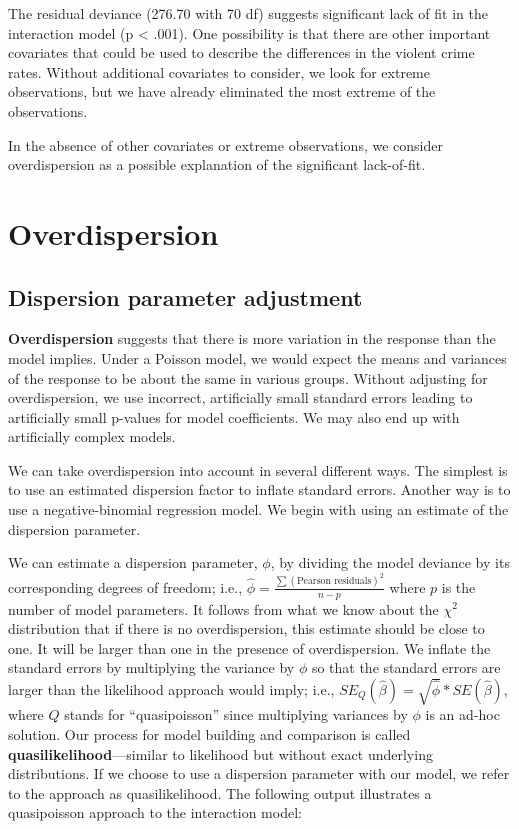\documentclass[
]{krantz}
\begin{document}
The residual deviance (276.70 with 70 df) suggests significant lack of fit in the interaction model (p \textless{} .001). One possibility is that there are other important covariates that could be used to describe the differences in the violent crime rates. Without additional covariates to consider, we look for extreme observations, but we have already eliminated the most extreme of the observations.

In the absence of other covariates or extreme observations, we consider overdispersion as a possible explanation of the significant lack-of-fit.

\hypertarget{sec-overdispPois}{%
\section{Overdispersion}\label{sec-overdispPois}}

\hypertarget{dispersion-parameter-adjustment}{%
\subsection{Dispersion parameter adjustment}\label{dispersion-parameter-adjustment}}

\textbf{Overdispersion} suggests that there is more variation in the response than the model implies. Under a Poisson model, we would expect the means and variances of the response to be about the same in various groups. Without adjusting for overdispersion, we use incorrect, artificially small standard errors leading to artificially small p-values for model coefficients. We may also end up with artificially complex models.

We can take overdispersion into account in several different ways. The simplest is to use an estimated dispersion factor to inflate standard errors. Another way is to use a negative-binomial regression model. We begin with using an estimate of the dispersion parameter.

We can estimate a dispersion parameter, \(\phi\), by dividing the model deviance by its corresponding degrees of freedom; i.e., \(\hat\phi=\frac{\sum(\textrm{Pearson residuals})^2}{n-p}\) where \(p\) is the number of model parameters. It follows from what we know about the \(\chi^2\) distribution that if there is no overdispersion, this estimate should be close to one. It will be larger than one in the presence of overdispersion. We inflate the standard errors by multiplying the variance by \(\phi\) so that the standard errors are larger than the likelihood approach would imply; i.e., \(SE_Q(\hat\beta)=\sqrt{\hat\phi}*SE(\hat\beta)\), where \(Q\) stands for ``quasipoisson'' since multiplying variances by \(\phi\) is an ad-hoc solution. Our process for model building and comparison is called \textbf{quasilikelihood}---similar to likelihood but without exact underlying distributions. If we choose to use a dispersion parameter with our model, we refer to the approach as quasilikelihood. The following output illustrates a quasipoisson approach to the interaction model:
\end{document}
